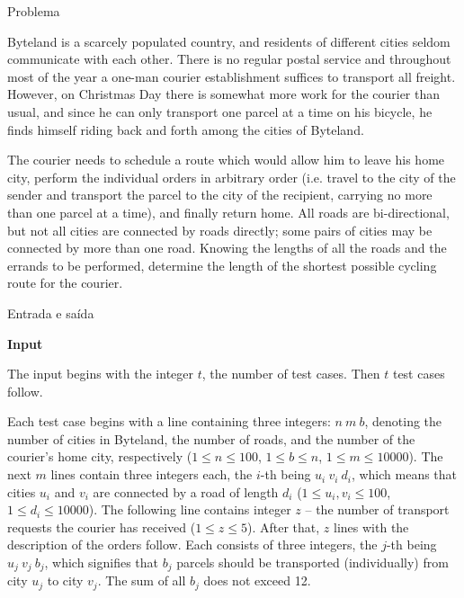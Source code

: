 
\begin{frame}[fragile]{Problema}


Byteland is a scarcely populated country, and residents of different cities seldom communicate with
each other. There is no regular postal service and throughout most of the year a one-man courier
establishment suffices to transport all freight. However, on Christmas Day there is somewhat more
work for the courier than usual, and since he can only transport one parcel at a time on his
bicycle, he finds himself riding back and forth among the cities of Byteland.

The courier needs to schedule a route which would allow him to leave his home city, perform the 
individual orders in arbitrary order (i.e. travel to the city of the sender and transport the 
parcel to the city of the recipient, carrying no more than one parcel at a time), and finally 
return home. All roads are bi-directional, but not all cities are connected by roads directly; some 
pairs of cities may be connected by more than one road. Knowing the lengths of all the roads and 
the errands to be performed, determine the length of the shortest possible cycling route for the 
courier.

\end{frame}

\begin{frame}[fragile]{Entrada e saída}

\textbf{Input}

The input begins with the integer $t$, the number of test cases. Then $t$ test cases follow.

Each test case begins with a line containing three integers: $n\ m\ b$, denoting the number of 
cities in Byteland, the number of roads, and the number of the courier's home city, respectively
($1\leq n\leq 100$, $1\leq b\leq n$, $1\leq m\leq 10000$). The next $m$ lines contain three integers 
each, the $i$-th being $u_i\ v_i\ d_i$, which means that cities $u_i$ and $v_i$ are connected by a 
road of length $d_i$ ($1\leq u_i, v_i\leq 100$, $1\leq d_i\leq 10000$). The following line contains 
integer $z$ -- the number of transport requests the courier has received ($1\leq z\leq 5$). After 
that, $z$ lines with the description of the orders follow. Each consists of three integers, the 
$j$-th being $u_j\ v_j\ b_j$, which signifies that $b_j$ parcels should be transported 
(individually) from city $u_j$ to city $v_j$. The sum of all $b_j$ does not exceed 12.

\end{frame}

